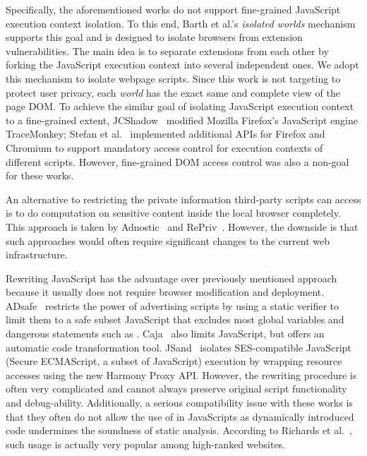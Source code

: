 Specifically, the aforementioned works do not support fine-grained JavaScript execution context isolation.  To this end, Barth et al.'s \emph{isolated worlds} mechanism~\cite{extension} supports this goal and is designed to isolate browsers from extension vulnerabilities.  The main idea is to separate extensions from each other by forking the JavaScript execution context into several independent ones.  We adopt this mechanism to isolate webpage scripts.  Since this work is not targeting to protect user privacy, each \emph{world} has the exact same and complete view of the page DOM.  To achieve the similar goal of isolating JavaScript execution context to a fine-grained extent, JCShadow~\cite{JCShadow} modified Mozilla Firefox's JavaScript engine TraceMonkey; Stefan et al.~\cite{COWL} implemented additional APIs for Firefox and Chromium to support mandatory access control for execution contexts of different scripts.  However, fine-grained DOM access control was also a non-goal for these works.  

An alternative to restricting the private information third-party scripts can access is to do computation on sensitive content inside the local browser completely.  This approach is taken by Adnostic~\cite{Adnostic} and RePriv~\cite{RePriv}. However, the downside is that such approaches would often require significant changes to the current web infrastructure.

 Rewriting JavaScript has the advantage over previously mentioned approach because it usually does not require browser modification and deployment.  ADsafe~\cite{ADsafe} restricts the power of advertising scripts by using a static verifier to limit them to a safe subset JavaScript that excludes most global variables and dangerous statements such as .  Caja~\cite{caja} also limits JavaScript, but offers an automatic code transformation tool.  JSand\footnotemark[1]~\cite{Agten:2012:JCC:2420950.2420952} isolates SES-compatible JavaScript (Secure ECMAScript, a subset of JavaScript) execution by wrapping resource accesses using the new Harmony Proxy API.  However, the rewriting procedure is often very complicated and cannot always preserve original script functionality and debug-ability.  Additionally, a serious compatibility issue with these works is that they often do not allow the use of  in JavaScripts as dynamically introduced code undermines the soundness of static analysis.  According to Richards et al.~\cite{Richards:2010:ADB:1806596.1806598}, such usage is actually very popular among high-ranked websites. 

